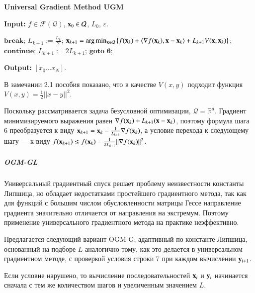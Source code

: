 \documentclass{crm-article}
\begin{document}
\begin{algorithm}
\caption{\bf{Universal Gradient Method UGM}}
\label{UGM}
\hspace*{\algorithmicindent} \textbf{Input: } $f\in \mathcal{F}(\mathcal{Q})$, ${\bf x}_0\in\mathcal{Q}$, $L_0$, $\varepsilon$.
\begin{algorithmic}[1]
\STATE $\textbf{break}$;
\ENDIF
\STATE $L_{k+1}:=\frac{L_k}{2}$;
\STATE ${\bf x}_{k+1} = \arg\min_{{\bf x}\in \mathcal{Q}} \left\{f({\bf x}_k) + \langle\nabla f({\bf x}_k), {\bf x}-{\bf x}_k\rangle + L_{k+1} V({\bf x}, {\bf x}_k) \right\}$;
\STATE $\textbf{continue}$;
\ELSE
\STATE $L_{k+1} := 2L_{k+1}$;
\STATE $\textbf{goto 6}$;
\ENDIF
\ENDFOR
\end{algorithmic}
\hspace*{\algorithmicindent} \textbf{Output: } $[x_0\ldots x_N]$.
\end{algorithm}

В замечании 2.1 пособия \cite{gasnikov2017universal} показано, что в качестве $V(x,y)$ подходит функция $V(x,y) = \frac{1}{2}||x-y||^2$.

Поскольку рассматривается задача безусловной оптимизации, $\mathcal{Q} = \mathbb{R}^d$. Градиент минимизируемого выражения равен $\nabla f({\bf x}_k) + L_{k+1}({\bf x} - {\bf x}_k)$, поэтому формула шага 6 преобразуется к виду ${\bf x}_{k+1} = {\bf x}_k - \frac{1}{L_{k+1}}\nabla f({\bf x}_k)$, а условие перехода к следующему шагу --- к виду $f({\bf x}_{k+1}) \leq f({\bf x}_k) - \frac{1}{2L_{k+1}}||\nabla f({\bf x}_k)||^2$.

\subparagraph{OGM-GL}

Универсальный градиентный спуск решает проблему неизвестности константы Липшица, но обладает недостатками простейшего градиентного метода, так как для функций с большим числом обусловленности матрицы Гессе направление градиента значительно отличается от направления на экстремум. Поэтому применение универсального градиентного метода на практике неэффективно.

Предлагается следующий вариант OGM-G, адаптивный по константе Липшица, основанный на подборе $L$ аналогично тому, как это делается в универсальном градиентном методе, с проверкой условия строки 7 при каждом вычислении ${\bf y}_{i+1}$.

Если условие нарушено, то вычисление последовательностей ${\bf x}_i$ и ${\bf y}_i$ начинается сначала с тем же количеством шагов и увеличенным значением $L$.
\end{document}
